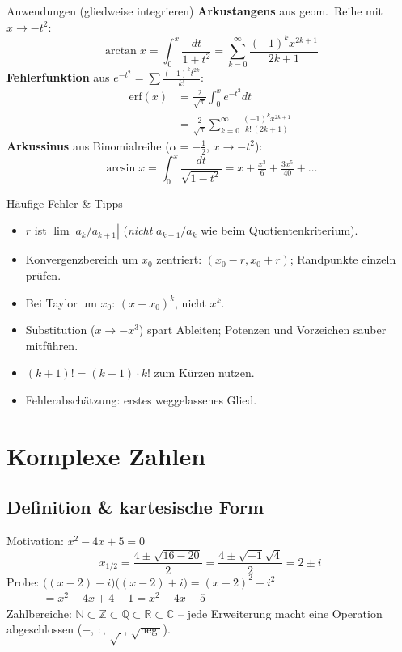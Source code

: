 \documentclass[a4paper, fontsize=7pt]{scrartcl}
\def\N{\mathbb{N}}  %
\def\Z{\mathbb{Z}}  %
\def\Q{\mathbb{Q}}  %
\def\R{\mathbb{R}}  %
\def\C{\mathbb{C}}  %
\begin{document}
\begin{subbox}{Anwendungen (gliedweise integrieren)}
\textbf{Arkustangens} aus geom.\ Reihe mit $x \to -t^2$:
$$\arctan x = \int_0^x \frac{dt}{1+t^2} = \sum_{k=0}^{\infty}
\frac{(-1)^k x^{2k+1}}{2k+1}$$
\textbf{Fehlerfunktion} aus $e^{-t^2} = \sum \frac{(-1)^k t^{2k}}{k!}$:
\begin{align*}
\text{erf}(x) &= \tfrac{2}{\sqrt\pi}\int_0^x e^{-t^2} dt\\
&= \tfrac{2}{\sqrt\pi} \sum_{k=0}^{\infty} \frac{(-1)^k x^{2k+1}}{k!\,(2k+1)}
\end{align*}
\textbf{Arkussinus} aus Binomialreihe ($\alpha = -\frac12$, $x \to -t^2$):
$$\arcsin x = \int_0^x \frac{dt}{\sqrt{1-t^2}}
= x + \tfrac{x^3}{6} + \tfrac{3x^5}{40} + \ldots$$
\end{subbox}

\begin{subbox}{Häufige Fehler \& Tipps}
\begin{itemize}
    \item $r$ ist $\lim |a_k / a_{k+1}|$ (\emph{nicht} $a_{k+1}/a_k$ wie
          beim Quotientenkriterium).
    \item Konvergenzbereich um $x_0$ zentriert: $(x_0 - r, x_0 + r)$;
          Randpunkte einzeln prüfen.
    \item Bei Taylor um $x_0$: $(x - x_0)^k$, nicht $x^k$.
    \item Substitution ($x \to -x^3$) spart Ableiten; Potenzen und
          Vorzeichen sauber mitführen.
    \item $(k+1)! = (k+1) \cdot k!$ zum Kürzen nutzen.
    \item Fehlerabschätzung: erstes weggelassenes Glied.
\end{itemize}
\end{subbox}

\section{Komplexe Zahlen}

\subsection{Definition \& kartesische Form}

\begin{subbox}{Motivation: $x^2 - 4x + 5 = 0$}
$$x_{1/2} = \frac{4 \pm \sqrt{16 - 20}}{2} = \frac{4 \pm \sqrt{-1}\sqrt{4}}{2}
= 2 \pm i$$
Probe: $\big((x-2) - i\big)\big((x-2) + i\big) = (x-2)^2 - i^2$\\
$\phantom{\text{Probe: }} = x^2 - 4x + 4 + 1 = x^2 - 4x + 5$ \checkmark\\
Zahlbereiche: $\N \subset \Z \subset \Q \subset \R \subset \C$ -- jede
Erweiterung macht eine Operation abgeschlossen ($-$, $:$, $\sqrt{\ }$,
$\sqrt{\text{neg.}}$).
\end{subbox}
\end{document}
